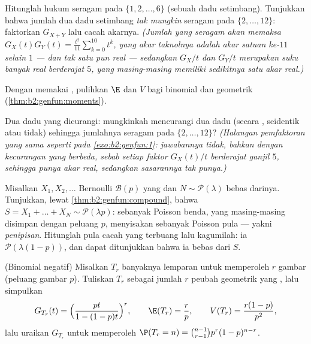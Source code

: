 \begin{exercise}[$\star$]\label{exo:b2:genfun:1}
Hitunglah  hukum seragam pada $\{1, 2,
\dots, 6\}$ (sebuah dadu setimbang). Tunjukkan bahwa jumlah dua dadu setimbang
\emph{tak mungkin} seragam pada $\{2, \dots, 12\}$: faktorkan $G_{X+Y}$
lalu cacah akarnya. \emph{(Jumlah yang seragam akan memaksa $G_X(t)G_Y(t) =
\frac{t^2}{11}\sum_{k=0}^{10}t^k$, yang akar taknolnya adalah
akar satuan ke-$11$ selain $1$ --- dan tak satu pun real ---
sedangkan $G_X/t$ dan $G_Y/t$ merupakan suku banyak real berderajat $5$, yang
masing-masing memiliki sedikitnya satu akar real.)}
\end{exercise}

\begin{exercise}[$\star$]\label{exo:b2:genfun:2}
Dengan memakai , pulihkan $\E$ dan $V$ bagi  binomial
dan  geometrik (\cref{thm:b2:genfun:moments}).
\end{exercise}

\begin{exercise}[$\star$]\label{exo:b2:genfun:3}
Dua dadu yang dicurangi: mungkinkah mencurangi dua dadu (secara ,
seidentik atau tidak) sehingga jumlahnya seragam pada $\{2, \dots,
12\}$? \emph{(Halangan pemfaktoran yang sama seperti pada
\cref{exo:b2:genfun:1}: jawabannya tidak, bahkan dengan kecurangan yang berbeda,
sebab setiap faktor $G_X(t)/t$ berderajat ganjil $5$,
sehingga punya akar real, sedangkan sasarannya tak punya.)}
\end{exercise}

\begin{exercise}[$\star\star$]\label{exo:b2:genfun:4}
Misalkan $X_1, X_2, \dots$ Bernoulli $\mathcal{B}(p)$ yang 
dan $N \sim \mathcal{P}(\lambda)$ bebas darinya. Tunjukkan,
lewat \cref{thm:b2:genfun:compound}, bahwa $S = X_1 + \dots + X_N
\sim \mathcal{P}(\lambda p)$: sebanyak Poisson benda, yang masing-masing disimpan
dengan peluang $p$, menyisakan sebanyak Poisson pula --- yakni \emph{penipisan}.
Hitunglah pula  cacah yang terbuang lalu kagumilah: ia
$\mathcal{P}(\lambda(1-p))$, dan dapat ditunjukkan bahwa ia bebas
dari $S$.
\end{exercise}

\begin{exercise}[$\star\star$]\label{exo:b2:genfun:5}
(Binomial negatif) Misalkan $T_r$ banyaknya lemparan untuk memperoleh
$r$ gambar (peluang gambar $p$). Tuliskan $T_r$ sebagai jumlah $r$
peubah geometrik yang , lalu simpulkan
\[
G_{T_r}(t) = \Bigl(\frac{pt}{1 - (1-p)t}\Bigr)^{r},
\qquad
\E(T_r) = \frac rp,
\qquad
V(T_r) = \frac{r(1-p)}{p^2},
\]
lalu uraikan $G_{T_r}$ untuk memperoleh $\P(T_r = n) = \binom{n-1}{r-1}
p^r(1-p)^{n-r}$.
\end{exercise}

